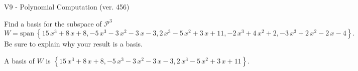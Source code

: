 \begin{exercise}
  \begin{exerciseTitle}V9 - Polynomial Computation (ver. 456)\end{exerciseTitle}
  \begin{exerciseStatement}
    Find a basis for the subspace of \(\mathcal{P}^3\) 
\[W=\mathrm{span}\ \left\{15 \, x^{3} + 8 \, x + 8 , -5 \, x^{3} - 3 \, x^{2} - 3 \, x - 3 , 2 \, x^{3} - 5 \, x^{2} + 3 \, x + 11 , -2 \, x^{3} + 4 \, x^{2} + 2 , -3 \, x^{3} + 2 \, x^{2} - 2 \, x - 4\right\}.\]
 Be sure to explain why your result is a basis.


  \end{exerciseStatement}
  \begin{exerciseAnswer}
   A basis of \(W\) is  \(\left\{15 \, x^{3} + 8 \, x + 8 , -5 \, x^{3} - 3 \, x^{2} - 3 \, x - 3 , 2 \, x^{3} - 5 \, x^{2} + 3 \, x + 11\right\}\).
  


  \end{exerciseAnswer}
\end{exercise}